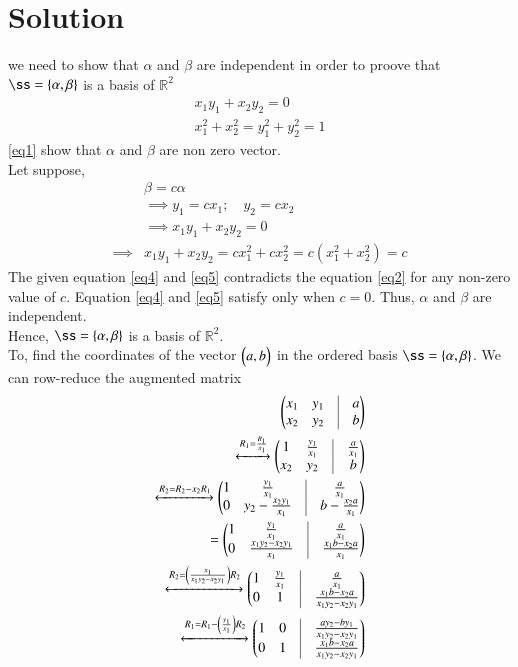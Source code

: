 \documentclass[journal,12pt,twocolumn]{IEEEtran}
\begin{document}
\section{Solution}
we need to show that $\alpha$ and $\beta$ are independent in order to proove that $\ss=\{\vec{\alpha},\vec{\beta}\}$ is a basis of $\mathbb{R}^2$
\begin{align}
x_1y_1+x_2y_2=0\label{eq0}\\
x_1^2+x_2^2=y_1^2+y_2^2=1 \label{eq1}
\end{align}
\ref{eq1} show that $\alpha$ and $\beta$ are non zero vector.\\
Let suppose,
\begin{align}
&\beta=c\alpha\label{eq2}\\
&\implies y_1=cx_1 ; \quad y_2=cx_2\\
&\implies x_1y_1+x_2y_2=0\label{eq4}\\
\implies&x_1y_1+x_2y_2=cx_1^2+cx_2^2=c(x_1^2+x_2^2)=c\label{eq5}
\end{align}
The given equation \ref{eq4} and \ref{eq5} contradicts the equation \ref{eq2} for any non-zero value of $c$. Equation \ref{eq4} and \ref{eq5} satisfy only when $c=0$.
Thus, $\alpha$ and $\beta$ are independent. \\
Hence, $\ss=\{\vec{\alpha},\vec{\beta}\}$ is a basis of $\mathbb{R}^2$.\\
To, find the coordinates of the vector $\begin{pmatrix}a,b\end{pmatrix}$ in the ordered basis $\ss=\{\vec{\alpha},\vec{\beta}\}$. We
can row-reduce the augmented matrix
   \begin{align}
      \myvec{x_1&y_1&\vrule&a\\x_2&y_2&\vrule&b}\\
        \xleftrightarrow{R_1=\frac{R_1}{x_1}}\myvec{1&\frac{y_1}{x_1}&\vrule&\frac{a}{x_1}\\x_2&y_2&\vrule&b}\\
     \xleftrightarrow{R_2=R_2-x_2R_1}\myvec{1&\frac{y_1}{x_1}&\vrule&\frac{a}{x_1}\\0&y_2-\frac{x_2y_1}{x_1}&\vrule&b-\frac{x_2a}{x_1}}\\
     =\myvec{1&\frac{y_1}{x_1}&\vrule&\frac{a}{x_1}\\0&\frac{x_1y_2-x_2y_1}{x_1}&\vrule&\frac{x_1b-x_2a}{x_1}}\\
      \xleftrightarrow{R_2=\left(\frac{x_1}{x_1y_2-x_2y_1}\right)R_2}\myvec{1&\frac{y_1}{x_1}&\vrule&\frac{a}{x_1}\\0&1&\vrule&\frac{x_1b-x_2a}{x_1y_2-x_2y_1}}\\
      \xleftrightarrow{R_1=R_1-\left(\frac{y_1}{x_1}\right)R_2}\myvec{1&0&\vrule&\frac{ay_2-by_1}{x_1y_2-x_2y_1}\\0&1&\vrule&\frac{x_1b-x_2a}{x_1y_2-x_2y_1}}\label{eq12}
\end{align}
\end{document}
